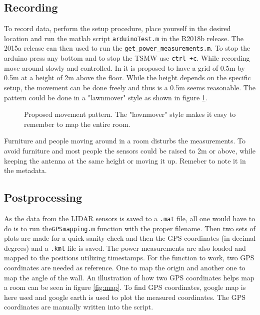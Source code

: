 \documentclass[a4paper,twoside, 12pt]{article}
\begin{document}
\subsection{Recording}

To record data, perform the setup procedure, place yourself in the desired location and run the matlab script \texttt{arduinoTest.m} in the R2018b release. The 2015a release can then used to run the \texttt{get\_power\_measurements.m}. To stop the arduino press any bottom and to stop the TSMW use \texttt{ctrl +c}. While recording move around slowly and controlled. In \cite{artikel} it is proposed to have a grid of 0.5m by 0.5m at a height of 2m above the floor. While the height depends on the specific setup, the movement can be done freely and thus is a 0.5m seems reasonable. The pattern could be done in a "lawnmover" style as shown in figure \ref{fig:lawnmover}.
\begin{figure}[ht]
\centering
{}
\caption{Proposed movement pattern. The "lawnmover" style makes it easy to remember to map the entire room.}
\label{fig:lawnmover}
\end{figure}

Furniture and people moving around in a room disturbs the measurements. To avoid furniture and most people the sensors could be raised to 2m or above, while keeping the antenna at the same height or moving it up. Remeber to note it in the metadata.

\subsection{Postprocessing}
As the data from the LIDAR sensors is saved to a \texttt{.mat} file, all one would have to do is to run the\texttt{GPSmapping.m} function with the proper filename. Then two sets of plots are made for a quick sanity check and then the GPS coordinates (in decimal degrees) and a \texttt{.kml} file is saved. The power measurements are also loaded and mapped to the positions utilizing timestamps. For the function to work, two GPS coordinates are needed as reference. One to map the origin and another one to map the angle of the wall. An illustration of how two GPS coordinates helps map a room can be seen in figure \ref{fig:map}. To find GPS coordinates, google map is here used and google earth is used to plot the measured coordinates. The GPS coordinates are manually written into the script. 
\end{document}
